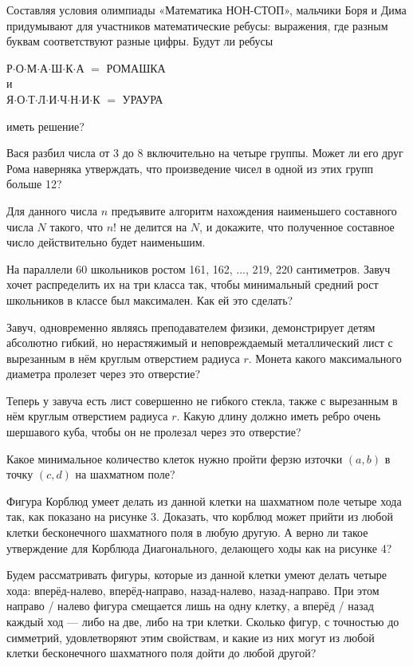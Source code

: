 \begin{itemize}
\itA Составляя условия олимпиады «Математика НОН-СТОП», мальчики Боря и Дима придумывают для участников математические ребусы: выражения, где разным буквам соответствуют разные цифры. Будут ли ребусы
\begin{center}
	Р$\cdot$О$\cdot$М$\cdot$А$\cdot$Ш$\cdot$К$\cdot$А $=$ РОМАШКА\\
	и \\
	Я$\cdot$О$\cdot$Т$\cdot$Л$\cdot$И$\cdot$Ч$\cdot$Н$\cdot$И$\cdot$К $=$ УРАУРА
\end{center}
иметь решение?

\itB Вася разбил числа от 3 до 8 включительно на четыре группы. Может ли его друг Рома наверняка утверждать, что произведение чисел в одной из этих групп больше 12?

\itC Для данного числа $n$ предъявите алгоритм нахождения наименьшего составного числа $N$ такого, что $n!$ не делится на $N$, и докажите, что полученное составное число действительно будет наименьшим.
\end{itemize}

\begin{itemize}
\itA На параллели 60 школьников ростом 161, 162, ..., 219, 220 сантиметров. Завуч хочет распределить их на три класса так, чтобы минимальный средний рост школьников в классе был максимален. Как ей это сделать?

\itB Завуч, одновременно являясь преподавателем физики, демонстрирует детям абсолютно гибкий, но нерастяжимый и неповреждаемый металлический лист с вырезанным в нём круглым отверстием радиуса $r$. Монета какого максимального диаметра пролезет через это отверстие?

\itC Теперь у завуча есть лист совершенно не гибкого стекла, также с вырезанным в нём круглым отверстием радиуса $r$. Какую длину должно иметь ребро очень шершавого куба, чтобы он не пролезал через это отверстие?
\end{itemize}

\begin{itemize}
\itA Какое минимальное количество клеток нужно пройти ферзю из\linebreak точки $(a,b)$ в точку $(c,d)$ на шахматном поле?

\itB Фигура Корблюд умеет делать из данной клетки на шахматном поле четыре хода так, как показано на рисунке 3. Доказать, что корблюд может прийти из любой клетки бесконечного шахматного поля в любую другую. А верно ли такое утверждение для Корблюда Диагонального, делающего ходы как на рисунке 4?

\itC Будем рассматривать фигуры, которые из данной клетки умеют делать четыре хода: вперёд-налево, вперёд-направо, назад-налево, назад-направо. При этом направо / налево фигура смещается лишь на одну клетку, а вперёд / назад каждый ход — либо на две, либо на три клетки. Сколько фигур, с точностью до симметрий, удовлетворяют этим свойствам, и какие из них могут из любой клетки бесконечного шахматного поля дойти до любой другой?
\end{itemize}

